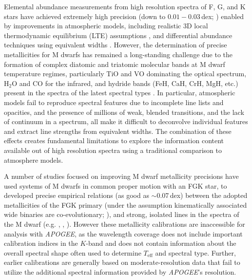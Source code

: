 \documentclass[twocolumn]{aastex62}
\newcommand{\apogee}{\textsl{APOGEE}}
\newcommand{\teff}{T_{\mathrm{eff}}}
\begin{document}
Elemental abundance measurements from high resolution spectra of F, G, and K stars have achieved extremely high precision (down to $0.01-0.03$\,dex; \citealt{Nissen2018}) enabled by improvements in atmospheric models, including realistic 3D local thermodynamic equilibrium (LTE) assumptions \citep{Asplund2005}, and differential abundance techniques using equivalent widths \citep{Bedell2014}. However, the determination of precise metallicities for M dwarfs has remained a long-standing challenge due to the formation of complex diatomic and triatomic molecular bands at M dwarf temperature regimes, particularly TiO and VO dominating the optical spectrum, H$_2$O and CO for the infrared, and hydride bands (FeH, CaH, CrH, MgH, etc.) present in the spectra of the latest spectral types \citep{Allard1997}.
In particular, atmospheric models fail to reproduce spectral features \citep[e.g.,][]{Mann:2013c} due to incomplete line lists and opacities, and the presence of millions of weak, blended transitions, and the lack of continuum in a spectrum, all make it difficult to deconvolve individual features and extract line strengths from equivalent widths. The combination of these effects creates fundamental limitations to explore the information content available out of high resolution spectra using a traditional comparison to atmosphere models.

A number of studies focused on improving M dwarf metallicity precisions have used systems of M dwarfs in common proper motion with an FGK star, to developed precise empirical relations (as good as $\sim$0.07\,dex) between the adopted metallicities of the FGK primary (under the assumption kinematically associated wide binaries are co-evolutionary; \citealt{Bonfils:2005}), and strong, isolated lines in the spectra of the M dwarf (e.g. \citealt{Terrien:2012}, \citealt{Rojas-Ayala:2012}, \citealt{Newton:2014}). However these metallicity calibrations are inaccessible for analysis with \apogee, as the wavelength coverage does not include important calibration indices in the $K$-band and does not contain information about the overall spectral shape often used to determine $\teff$ and spectral type. Further, earlier calibrations are generally based on moderate-resolution data \citep[with some exceptions,][]{Neves:2014, Lindgren:2016} that fail to utilize the additional spectral information provided by \apogee's resolution.

\end{document}
